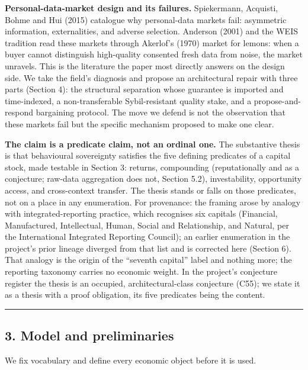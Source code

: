 \documentclass[
  11pt,
]{article}
\begin{document}
\textbf{Personal-data-market design and its failures.} Spiekermann,
Acquisti, Bohme and Hui (2015) catalogue why personal-data markets fail:
asymmetric information, externalities, and adverse selection. Anderson
(2001) and the WEIS tradition read these markets through Akerlof's
(1970) market for lemons: when a buyer cannot distinguish high-quality
consented fresh data from noise, the market unravels. This is the
literature the paper most directly answers on the design side. We take
the field's diagnosis and propose an architectural repair with three
parts (Section 4): the structural separation whose guarantee is imported
and time-indexed, a non-transferable Sybil-resistant quality stake, and
a propose-and-respond bargaining protocol. The move we defend is not the
observation that these markets fail but the specific mechanism proposed
to make one clear.

\textbf{The claim is a predicate claim, not an ordinal one.} The
substantive thesis is that behavioural sovereignty satisfies the five
defining predicates of a capital stock, made testable in Section 3:
returns, compounding (reputationally and as a conjecture; raw-data
aggregation does not, Section 5.2), investability, opportunity access,
and cross-context transfer. The thesis stands or falls on those
predicates, not on a place in any enumeration. For provenance: the
framing arose by analogy with integrated-reporting practice, which
recognises six capitals (Financial, Manufactured, Intellectual, Human,
Social and Relationship, and Natural, per the International Integrated
Reporting Council); an earlier enumeration in the project's prior
lineage diverged from that list and is corrected here (Section 6). That
analogy is the origin of the ``seventh capital'' label and nothing more;
the reporting taxonomy carries no economic weight. In the project's
conjecture register the thesis is an occupied, architectural-class
conjecture (C55); we state it as a thesis with a proof obligation, its
five predicates being the content.

\begin{center}\rule{0.5\linewidth}{0.5pt}\end{center}

\subsection{3. Model and preliminaries}\label{model-and-preliminaries}

We fix vocabulary and define every economic object before it is used.
\end{document}
